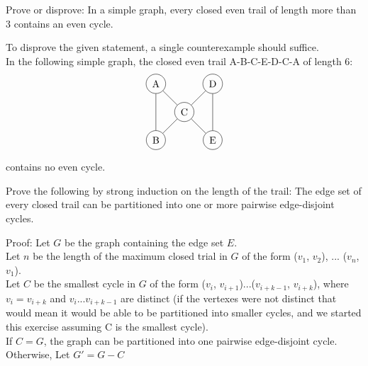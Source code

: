 \documentclass[12pt]{article}
\newenvironment{question}[2][Question]{\begin{trivlist}
\item[\hskip \labelsep {\bfseries #1}\hskip \labelsep {\bfseries #2.}]}{\end{trivlist}}
\begin{document}
\begin{question}{2}
Prove or disprove: In a simple graph, every closed even trail of length more than 3 contains an even cycle.
\end{question}

To disprove the given statement, a single counterexample should suffice.\\
In the following simple graph, the closed even trail A-B-C-E-D-C-A of length 6:\\
\begin{align*}
\begin{tikzpicture}
\node[shape=circle,draw=black] (B) at (1,0) {A};
\node[shape=circle,draw=black] (D) at (1,-2) {B};
\node[shape=circle,draw=black] (E) at (2,-1) {C};
\node[shape=circle,draw=black] (F) at (3,0) {D};
\node[shape=circle,draw=black] (H) at (3,-2) {E};
\path [] (B) edge node[left] {} (E);
\path [] (D) edge node[left] {} (E);
\path [] (E) edge node[left] {} (F);
\path [] (H) edge node[left] {} (E);
\path [] (B) edge node[left] {} (D);
\path [] (F) edge node[left] {} (H);
\end{tikzpicture}
\end{align*}
contains no even cycle. \\

\begin{question}{3}
Prove the following by strong induction on the length of the trail: The edge set of every closed trail can be partitioned into one or more pairwise edge-disjoint cycles.
\end{question}

Proof: Let $G$ be the graph containing the edge set $E$. \\

Let $n$ be the length of the maximum closed trial in $G$ of the form ($v_1$, $v_2$), ... ($v_n$, $v_1$). \\

Let $C$ be the smallest cycle in $G$ of the form ($v_i$, $v_{i+1}$)...($v_{i+k-1}$, $v_{i+k}$), where $v_i = v_{i+k}$ and $v_i$...$v_{i+k-1}$ are distinct (if the vertexes were not distinct that would mean it would be able to be partitioned into smaller cycles, and we started this exercise assuming C is the smallest cycle). \\

If $C = G$, the graph can be partitioned into one pairwise edge-disjoint cycle.\\

Otherwise, Let $G' = G - C$\\
\end{document}
